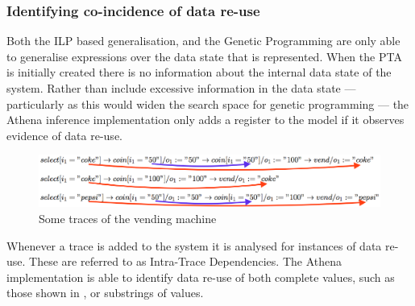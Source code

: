 \subsubsection{Identifying co-incidence of data re-use}
\label{IntertraceDependencies}

Both the ILP based generalisation, and the Genetic Programming are only able to generalise expressions over the data state that is represented. When the PTA is initially created there is no information about the internal data state of the system. Rather than include excessive information in the data state --- particularly as this would widen the search space for genetic programming --- the Athena inference implementation only adds a register to the model if it observes evidence of data re-use.

\begin{figure}[h]
\begin{center}
\includegraphics[width=14cm]{figures/efsm/intratracedeps.eps}
\caption{Some traces of the vending machine}
\label{fig:intras}
\end{center}
\end{figure}

Whenever a trace is added to the system it is analysed for instances of data re-use. These are referred to as Intra-Trace Dependencies. The Athena implementation is able to identify data re-use of both complete values, such as those shown in , or substrings of values. 


